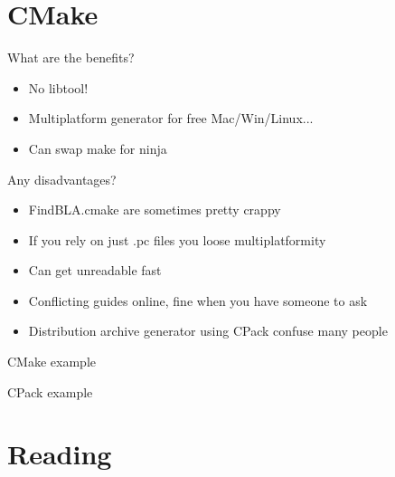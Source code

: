 \documentclass{beamer}
\begin{document}
\section{CMake}

\begin{frame}{What are the benefits?}
	\begin{itemize}
    \item No libtool!
    \item Multiplatform generator for free Mac/Win/Linux...
    \item Can swap make for ninja
	\end{itemize}
\end{frame}

\begin{frame}{Any disadvantages?}
	\begin{itemize}
    \item FindBLA.cmake are sometimes pretty crappy
    \item If you rely on just .pc files you loose multiplatformity
    \item Can get unreadable fast
    \item Conflicting guides online, fine when you have someone to ask
    \item Distribution archive generator using CPack confuse many people
	\end{itemize}
\end{frame}

\begin{frame}[t]{CMake example}
	\begin{small}
	
	\end{small}
\end{frame}

\begin{frame}[t]{CPack example}
	\begin{small}
	
	\end{small}
\end{frame}

\section{Reading}
\end{document}
